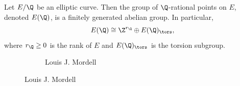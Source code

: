 \begin{frame}
	\begin{thm}[Mordell, 1922]
	Let $E/\Q$ be an elliptic curve. Then the group of $\Q$-rational points on $E$, denoted $E(\Q)$, is a finitely generated abelian group. In particular,
		\[
		E(\Q) \cong \Z^{r_\Q} \oplus E(\Q)_\tors,
		\]
	where $r_\Q \geq 0$ is the rank of $E$ and $E(\Q)_\tors$ is the torsion subgroup.
	\end{thm}
	\begin{figure}[h]
	\centering
	\begin{subfigure}{0.3\textwidth}
	\captionsetup{labelformat=empty}
	\centering
	\caption{Louis J. Mordell}
	\end{subfigure}
\end{figure}
\end{frame}
